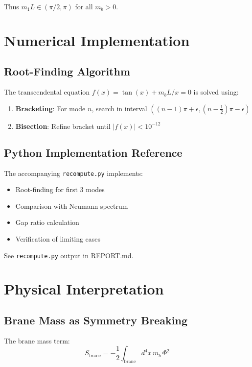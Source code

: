 \documentclass[11pt,a4paper]{article}
\newcommand{\mb}{m_b}
\theoremstyle{definition}
\theoremstyle{plain}
\theoremstyle{remark}
\begin{document}
Thus $m_1 L \in (\pi/2, \pi)$ for all $\mb > 0$.

\section{Numerical Implementation}
\label{app:numerical}

\subsection{Root-Finding Algorithm}

The transcendental equation $f(x) = \tan(x) + \mb L/x = 0$ is solved using:

\begin{enumerate}
\item \textbf{Bracketing}: For mode $n$, search in interval $((n-1)\pi + \epsilon, (n-\tfrac{1}{2})\pi - \epsilon)$
\item \textbf{Bisection}: Refine bracket until $|f(x)| < 10^{-12}$
\end{enumerate}

\subsection{Python Implementation Reference}

The accompanying \texttt{recompute.py} implements:
\begin{itemize}
\item Root-finding for first 3 modes
\item Comparison with Neumann spectrum
\item Gap ratio calculation
\item Verification of limiting cases
\end{itemize}

See \texttt{recompute.py} output in REPORT.md.

\section{Physical Interpretation}
\label{app:physical}

\subsection{Brane Mass as Symmetry Breaking}

The brane mass term:
\begin{equation}
S_{\mathrm{brane}} = -\frac{1}{2}\int_{\mathrm{brane}} d^4x\, \mb\, \Phi^2
\label{eq:brane-sb}
\end{equation}
\end{document}
